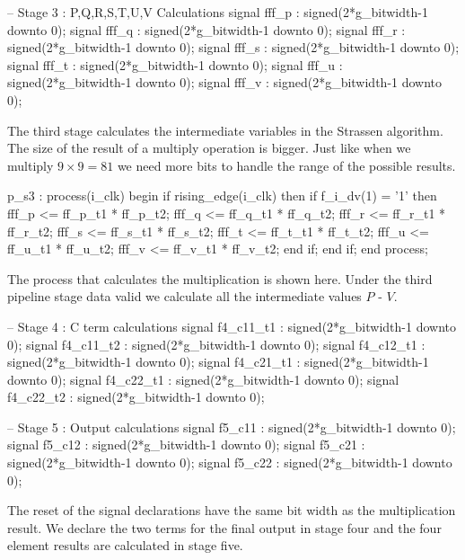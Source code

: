 \begin{VHDLlisting}[tabsize=2]
-- Stage 3 : P,Q,R,S,T,U,V Calculations
signal fff_p   : signed(2*g_bitwidth-1 downto 0);
signal fff_q   : signed(2*g_bitwidth-1 downto 0);
signal fff_r   : signed(2*g_bitwidth-1 downto 0);
signal fff_s   : signed(2*g_bitwidth-1 downto 0);
signal fff_t   : signed(2*g_bitwidth-1 downto 0);
signal fff_u   : signed(2*g_bitwidth-1 downto 0);
signal fff_v   : signed(2*g_bitwidth-1 downto 0);
\end{VHDLlisting}

The third stage calculates the intermediate variables in the Strassen algorithm. The size of the result of a multiply operation is bigger. Just like when we multiply $9 \times 9 = 81$ we need more bits to handle the range of the possible results. 

\begin{VHDLlisting}[tabsize=2]
p_s3 : process(i_clk)
begin
	if rising_edge(i_clk) then
		if f_i_dv(1) = '1' then
			fff_p <= ff_p_t1 * ff_p_t2;
			fff_q <= ff_q_t1 * ff_q_t2;
			fff_r <= ff_r_t1 * ff_r_t2;
			fff_s <= ff_s_t1 * ff_s_t2;
			fff_t <= ff_t_t1 * ff_t_t2;
			fff_u <= ff_u_t1 * ff_u_t2;
			fff_v <= ff_v_t1 * ff_v_t2;
		end if;
	end if;
end process;
\end{VHDLlisting}

The process that calculates the multiplication is shown here. Under the third pipeline stage data valid we calculate all the intermediate values $P$ - $V$. 

\begin{VHDLlisting}[tabsize=2]
-- Stage 4 : C term calculations
signal f4_c11_t1 : signed(2*g_bitwidth-1 downto 0);
signal f4_c11_t2 : signed(2*g_bitwidth-1 downto 0);
signal f4_c12_t1 : signed(2*g_bitwidth-1 downto 0);
signal f4_c21_t1 : signed(2*g_bitwidth-1 downto 0);
signal f4_c22_t1 : signed(2*g_bitwidth-1 downto 0);
signal f4_c22_t2 : signed(2*g_bitwidth-1 downto 0);
               
-- Stage 5 : Output calculations
signal f5_c11    : signed(2*g_bitwidth-1 downto 0);
signal f5_c12    : signed(2*g_bitwidth-1 downto 0);
signal f5_c21    : signed(2*g_bitwidth-1 downto 0);
signal f5_c22    : signed(2*g_bitwidth-1 downto 0);
\end{VHDLlisting}

The reset of the signal declarations have the same bit width as the multiplication result. We declare the two terms for the final output in stage four and the four element results are calculated in stage five. 


